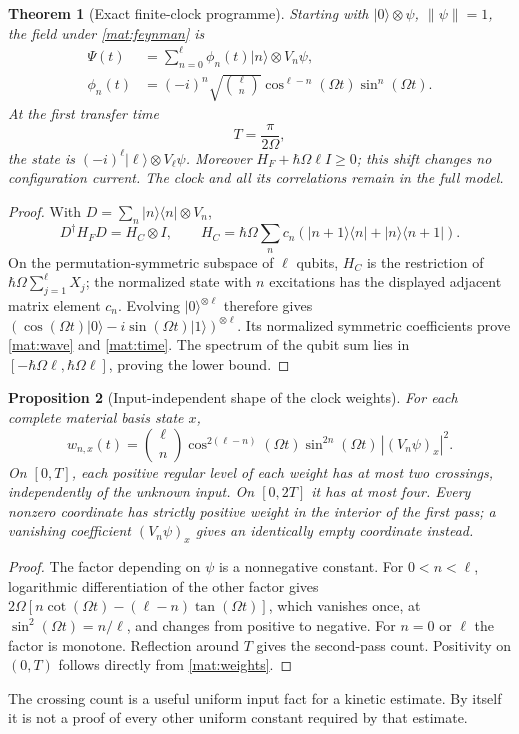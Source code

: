 \documentclass[11pt]{article}
\newtheorem{theorem}{Theorem}[section]
\newtheorem{proposition}[theorem]{Proposition}
\theoremstyle{definition}\newtheorem{definition}[theorem]{Definition}
\theoremstyle{remark}\newtheorem{remark}[theorem]{Remark}
\begin{document}
\begin{theorem}[Exact finite-clock programme]\label{mat:clock}
Starting with $|0\rangle\otimes\psi$, $\|\psi\|=1$, the field under
\eqref{mat:feynman} is
\begin{align}\label{mat:wave}
 \Psi(t)&=\sum_{n=0}^{\ell}\phi_n(t)|n\rangle\otimes V_n\psi,\\
 \phi_n(t)&=(-i)^n\sqrt{\binom\ell n}
   \cos^{\ell-n}(\Omega t)\sin^n(\Omega t).\nonumber
\end{align}
At the first transfer time
\begin{equation}\label{mat:time}
 T=\frac{\pi}{2\Omega},
\end{equation}
the state is $(-i)^\ell|\ell\rangle\otimes V_\ell\psi$.
Moreover $H_F+\hbar\Omega\ell I\ge0$; this shift changes no configuration
current.  The clock and all its correlations remain in the full model.
\end{theorem}
\begin{proof}
With $D=\sum_n|n\rangle\langle n|\otimes V_n$,
\[
 D^\dagger H_FD=H_C\otimes I,\qquad
 H_C=\hbar\Omega\sum_nc_n
       (|n+1\rangle\langle n|+|n\rangle\langle n+1|).
\]
On the permutation-symmetric subspace of $\ell$ qubits, $H_C$ is the
restriction of $\hbar\Omega\sum_{j=1}^\ell X_j$; the normalized state
with $n$ excitations has the displayed adjacent matrix element $c_n$.
Evolving $|0\rangle^{\otimes\ell}$ therefore gives
$(\cos(\Omega t)|0\rangle-i\sin(\Omega t)|1\rangle)^{\otimes\ell}$.
Its normalized symmetric coefficients prove \eqref{mat:wave} and
\eqref{mat:time}.  The spectrum of the qubit sum lies in
$[-\hbar\Omega\ell,\hbar\Omega\ell]$, proving the lower bound.
\end{proof}

\begin{proposition}[Input-independent shape of the clock weights]
\label{mat:levels}
For each complete material basis state $x$,
\begin{equation}\label{mat:weights}
 w_{n,x}(t)=\binom\ell n\cos^{2(\ell-n)}(\Omega t)
             \sin^{2n}(\Omega t)\,|(V_n\psi)_x|^2.
\end{equation}
On $[0,T]$, each positive regular level of each weight has at most two
crossings, independently of the unknown input.  On $[0,2T]$ it has at
most four.  Every nonzero coordinate has strictly positive weight in
the interior of the first pass; a vanishing coefficient
$(V_n\psi)_x$ gives an identically empty coordinate instead.
\end{proposition}
\begin{proof}
The factor depending on $\psi$ is a nonnegative constant.  For
$0<n<\ell$, logarithmic differentiation of the other factor gives
$2\Omega[n\cot(\Omega t)-(\ell-n)\tan(\Omega t)]$, which vanishes
once, at $\sin^2(\Omega t)=n/\ell$, and changes from positive to
negative.  For $n=0$ or $\ell$ the factor is monotone.  Reflection
around $T$ gives the second-pass count.  Positivity on $(0,T)$ follows
directly from \eqref{mat:weights}.
\end{proof}
The crossing count is a useful uniform input fact for a kinetic estimate.
By itself it is not a proof of every other uniform constant required by
that estimate.
\end{document}
